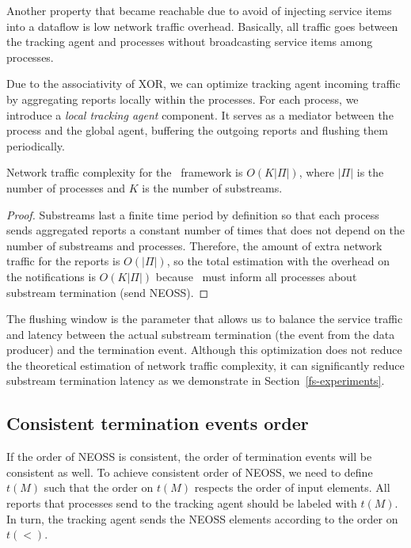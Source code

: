 Another property that became reachable due to avoid of injecting service items into a dataflow is low network traffic overhead. Basically, all traffic goes between the tracking agent and processes without broadcasting service items among processes.

Due to the associativity of XOR, we can optimize tracking agent incoming traffic by aggregating reports locally within the processes. For each process, we introduce a {\em local tracking agent} component. It serves as a mediator between the process and the global agent, buffering the outgoing reports and flushing them periodically. 

\begin{lemma}
Network traffic complexity for the \tracker\ framework is $O(K|\Pi|)$, where $|\Pi|$ is the number of processes and $K$ is the number of substreams.
\end{lemma}
\begin{proof}
Substreams last a finite time period by definition so that each process sends aggregated reports a constant number of times that does not depend on the number of substreams and processes. Therefore, the amount of extra network traffic for the reports is $O(|\Pi|)$, so the total estimation with the overhead on the notifications is $O(K|\Pi|)$ because \tracker\ must inform all processes about substream termination (send NEOSS).
\end{proof}

The flushing window is the parameter that allows us to balance the service traffic and latency between the actual substream termination (the event from the data producer) and the termination event. Although this optimization does not reduce the theoretical estimation of network traffic complexity, it can significantly reduce substream termination latency as we demonstrate in Section~\ref{fs-experiments}.

\subsection{Consistent termination events order}

If the order of NEOSS is consistent, the order of termination events will be consistent as well. To achieve consistent order of NEOSS, we need to define $t(M)$ such that the order on $t(M)$ respects the order of input elements. All reports that processes send to the tracking agent should be labeled with $t(M)$. In turn, the tracking agent sends the NEOSS elements according to the order on $t(<)$.

